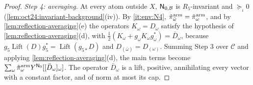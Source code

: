 \begin{proof}
\emph{Step 4: averaging.} At every atom outside $X$, $\mathsf N_{0,\mathcal B}$ is
$R_5$-invariant and $\succeq_\iota0$ (\cref{lem:oct24:invariant-background}(iv)). By
\ref{it:env:N4}, $\tilde\pi^{\rm arm}_{\bar\omega}=\tilde\pi^{\rm arm}_\omega$, and by
\cref{lem:reflection-averaging}(e) the operators $K_\omega=D_\omega$ satisfy the
hypothesis of \cref{lem:reflection-averaging}(d), with
$\frac12(K_\omega+g_\omega K_\omega g_\omega^*)=\bar D_\omega$, because
$g_5\operatorname{Lift}(D)g_5^*=\operatorname{Lift}(g_{5*}D)$ and $D_{(\bar\omega)}=D_{(\omega)}$. Summing
Step 3 over $\mathcal C$ and applying \cref{lem:reflection-averaging}(d), the main
terms become $\sum_\omega\tilde\pi^{\rm arm}_\omega Y^{\mathsf N_0}[[\bar D_\omega]_\omega]$. The operator
$\bar D_\omega$ is a lift, positive, annihilating every vector with a constant factor,
and of norm at most its cap.


\end{proof}
